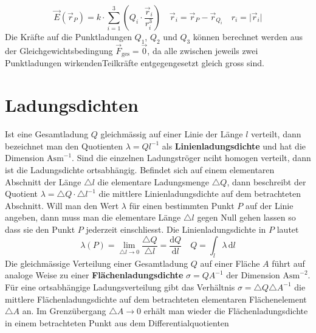 \begin{equation}
\boxed{\overrightarrow{E}\left(\overrightarrow{r}_P\right)=k\cdot \displaystyle \sum_{i=1}^3\left(Q_i\cdot \dfrac{\overrightarrow{r}_i}{r_i^3}\right)}\quad \boxed{\overrightarrow{r}_i=\overrightarrow{r}_P-\overrightarrow{r}_{Q_i}}\quad\boxed{r_i=\Big\vert \overrightarrow{r}_i\Big\vert}
\end{equation}
Die Kräfte auf die Punktladungen $Q_1$, $Q_2$ und $Q_3$ können berechnet werden aus der Gleichgewichtsbedingung $\overrightarrow{F}_{\text{ges}}=\overrightarrow{0}$, da alle zwischen jeweils zwei Punktladungen wirkendenTeilkräfte entgegengesetzt gleich gross sind.
\section{Ladungsdichten}
Ist eine Gesamtladung $Q$ gleichmässig auf einer Linie der Länge $l$ verteilt, dann bezeichnet man den Quotienten $\lambda=Ql^{-1}$ als \textbf{Linienladungsdichte} und hat die Dimension $\text{Asm}^{-1}$. Sind die einzelnen Ladungströger nciht homogen verteilt, dann ist die Ladungsdichte ortsabhängig. Befindet sich auf einem elementaren Abschnitt der Länge $\triangle l$ die elementare Ladungsmenge $\triangle Q$, dann beschreibt der Quotient $\lambda=\triangle Q\cdot \triangle l^{-1}$ die mittlere Linienladungsdichte auf dem betrachteten Abschnitt.
\newline\newline
Will man den Wert $\lambda$ für einen bestimmten Punkt $P$ auf der Linie angeben, dann muss man die elementare Länge $\triangle l$ gegen Null gehen lassen so dass sie den Punkt $P$ jederzeit einschliesst. Die Linienladungsdichte in $P$ lautet
\begin{equation}
\boxed{\lambda\left(P\right)=\displaystyle \lim_{\triangle l\rightarrow 0}\dfrac{\triangle Q}{\triangle l}=\dfrac{\text{d}Q}{\text{d}l}}\quad \boxed{Q=\displaystyle \int_l\lambda \,\text{d}l}
\end{equation}
Die gleichmässige Verteilung einer Gesamtladung $Q$ auf einer Fläche $A$ führt auf analoge Weise zu einer \textbf{Flächenladungsdichte} $\sigma=QA^{-1}$ der Dimension $\text{Asm}^{-2}$. Für eine ortsabhängige Ladungsverteilung gibt das Verhältnis $\sigma=\triangle Q\triangle A^{-1}$ die mittlere Flächenladungsdichte auf dem betrachteten elementaren Flächenelement $\triangle A$ an. Im Grenzübergang $\triangle A\rightarrow 0$ erhält man wieder die Flächenladungsdichte in einem betrachteten Punkt aus dem Differentialquotienten
